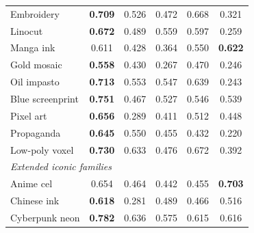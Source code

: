 \begin{table}[t]
\begin{tabular}{l ccccc}
  Embroidery       & \cellcolor{tabshade!49}\textbf{0.709} & \cellcolor{tabshade!33}0.526 & \cellcolor{tabshade!28}0.472 & \cellcolor{tabshade!45}0.668 & \cellcolor{tabshade!15}0.321 \\
  Linocut          & \cellcolor{tabshade!46}\textbf{0.672} & \cellcolor{tabshade!29}0.489 & \cellcolor{tabshade!36}0.559 & \cellcolor{tabshade!39}0.597 & \cellcolor{tabshade!9}0.259 \\
  Manga ink        & \cellcolor{tabshade!40}0.611 & \cellcolor{tabshade!24}0.428 & \cellcolor{tabshade!18}0.364 & \cellcolor{tabshade!35}0.550 & \cellcolor{tabshade!41}\textbf{0.622} \\
  Gold mosaic      & \cellcolor{tabshade!36}\textbf{0.558} & \cellcolor{tabshade!24}0.430 & \cellcolor{tabshade!10}0.267 & \cellcolor{tabshade!28}0.470 & \cellcolor{tabshade!8}0.246 \\
  Oil impasto      & \cellcolor{tabshade!49}\textbf{0.713} & \cellcolor{tabshade!35}0.553 & \cellcolor{tabshade!35}0.547 & \cellcolor{tabshade!43}0.639 & \cellcolor{tabshade!8}0.243 \\
  Blue screenprint & \cellcolor{tabshade!53}\textbf{0.751} & \cellcolor{tabshade!28}0.467 & \cellcolor{tabshade!33}0.527 & \cellcolor{tabshade!34}0.546 & \cellcolor{tabshade!34}0.539 \\
  Pixel art        & \cellcolor{tabshade!44}\textbf{0.656} & \cellcolor{tabshade!12}0.289 & \cellcolor{tabshade!23}0.411 & \cellcolor{tabshade!32}0.512 & \cellcolor{tabshade!26}0.448 \\
  Propaganda       & \cellcolor{tabshade!43}\textbf{0.645} & \cellcolor{tabshade!35}0.550 & \cellcolor{tabshade!26}0.455 & \cellcolor{tabshade!24}0.432 & \cellcolor{tabshade!6}0.220 \\
  Low-poly voxel   & \cellcolor{tabshade!51}\textbf{0.730} & \cellcolor{tabshade!42}0.633 & \cellcolor{tabshade!28}0.476 & \cellcolor{tabshade!46}0.672 & \cellcolor{tabshade!21}0.392 \\
  \midrule \multicolumn{6}{l}{\textit{Extended iconic families}}\\
  Anime cel        & \cellcolor{tabshade!44}0.654 & \cellcolor{tabshade!27}0.464 & \cellcolor{tabshade!25}0.442 & \cellcolor{tabshade!26}0.455 & \cellcolor{tabshade!48}\textbf{0.703} \\
  Chinese ink      & \cellcolor{tabshade!41}\textbf{0.618} & \cellcolor{tabshade!11}0.281 & \cellcolor{tabshade!29}0.489 & \cellcolor{tabshade!27}0.466 & \cellcolor{tabshade!32}0.516 \\
  Cyberpunk neon   & \cellcolor{tabshade!55}\textbf{0.782} & \cellcolor{tabshade!42}0.636 & \cellcolor{tabshade!37}0.575 & \cellcolor{tabshade!41}0.615 & \cellcolor{tabshade!41}0.616 \\

\end{tabular}
\end{table}
